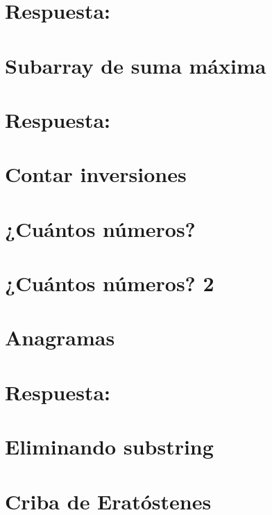 \section*{Respuesta:}

\fi

\section{Subarray de suma máxima}

\ifshowanswers
\section*{Respuesta:}

\fi

\section{Contar inversiones}


\section{¿Cuántos números?}


\section{¿Cuántos números? 2}


\section{Anagramas}

\ifshowanswers
\section*{Respuesta:}

\fi

\section{Eliminando substring}


\section{Criba de Eratóstenes}


